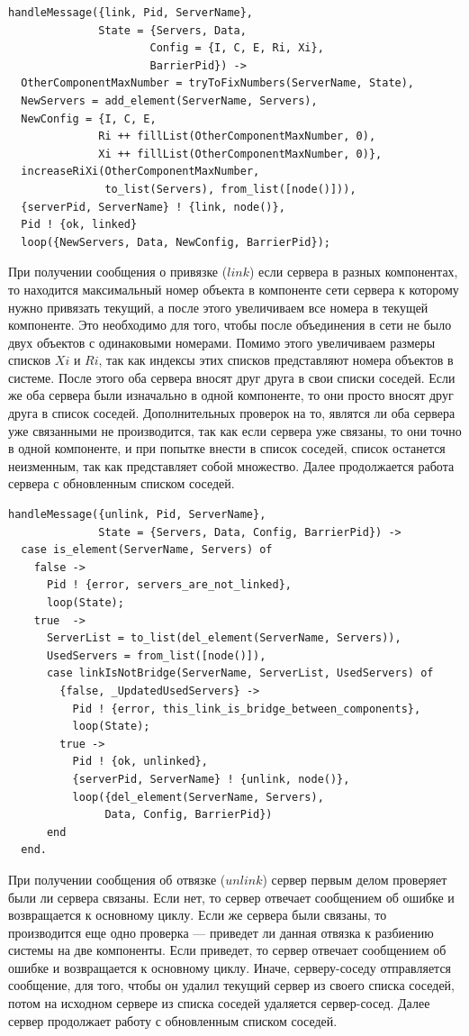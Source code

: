 			\begin{lstlisting}
handleMessage({link, Pid, ServerName}, 
              State = {Servers, Data, 
                      Config = {I, C, E, Ri, Xi}, 
                      BarrierPid}) ->
  OtherComponentMaxNumber = tryToFixNumbers(ServerName, State),
  NewServers = add_element(ServerName, Servers),
  NewConfig = {I, C, E, 
              Ri ++ fillList(OtherComponentMaxNumber, 0), 
              Xi ++ fillList(OtherComponentMaxNumber, 0)},
  increaseRiXi(OtherComponentMaxNumber,
               to_list(Servers), from_list([node()])),
  {serverPid, ServerName} ! {link, node()},   
  Pid ! {ok, linked}
  loop({NewServers, Data, NewConfig, BarrierPid});				
			\end{lstlisting}
			При получении сообщения о привязке ($link$) если сервера в разных компонентах, то находится максимальный номер объекта в компоненте сети сервера к которому нужно привязать текущий, 
			а после этого увеличиваем все номера в текущей компоненте. Это необходимо для того, чтобы после объединения в сети не было двух объектов с одинаковыми номерами. Помимо этого 
			увеличиваем размеры списков $Xi$ и $Ri$, так как индексы этих списков представляют номера объектов в системе. После этого оба сервера вносят друг друга в свои списки соседей. 
			Если же оба сервера были изначально в одной компоненте, то они просто вносят друг друга в список соседей. Дополнительных проверок на то, являтся ли оба сервера уже связанными 
			не производится, так как если сервера уже связаны, то они точно в одной компоненте, и при попытке внести в список соседей, список останется неизменным, так как представляет собой 
			множество. Далее продолжается работа сервера с обновленным списком соседей.

			\begin{lstlisting}
handleMessage({unlink, Pid, ServerName}, 
              State = {Servers, Data, Config, BarrierPid}) ->
  case is_element(ServerName, Servers) of
    false -> 
      Pid ! {error, servers_are_not_linked},
      loop(State);
    true  ->
      ServerList = to_list(del_element(ServerName, Servers)),
      UsedServers = from_list([node()]),
      case linkIsNotBridge(ServerName, ServerList, UsedServers) of
        {false, _UpdatedUsedServers} -> 
          Pid ! {error, this_link_is_bridge_between_components},
          loop(State);
        true ->
          Pid ! {ok, unlinked},
          {serverPid, ServerName} ! {unlink, node()},
          loop({del_element(ServerName, Servers), 
               Data, Config, BarrierPid})
      end
  end.				
			\end{lstlisting}
			При получении сообщения об отвязке ($unlink$) сервер первым делом проверяет были ли сервера связаны. Если нет, то сервер отвечает сообщением об ошибке и возвращается к 
			основному циклу. Если же сервера были связаны, то производится еще одно проверка --- приведет ли данная отвязка к разбиению системы на две компоненты. Если приведет, то
			сервер отвечает сообщением об ошибке и возвращается к основному циклу. Иначе, серверу-соседу отправляется сообщение, для того, чтобы он удалил текущий сервер из своего списка соседей,
			потом на исходном сервере из списка соседей удаляется сервер-сосед. Далее сервер продолжает работу с обновленным списком соседей.


